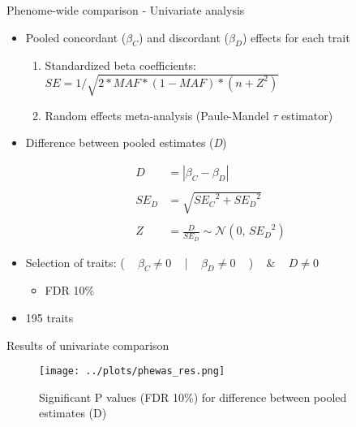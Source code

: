 \documentclass[presentation]{beamer}
\begin{document}
\begin{frame}[label={sec:org800a30b}]{Phenome-wide comparison - Univariate analysis}
\begin{itemize}
\item Pooled concordant (\(\beta_C\)) and discordant (\(\beta_D\)) effects for each trait
\begin{enumerate}
\item Standardized beta coefficients: ~ \(SE = 1/\sqrt{2 * MAF * (1 - MAF) * (n + Z^2)}\)
\item Random effects meta-analysis (Paule-Mandel \(\tau\) estimator)
\end{enumerate}
\item Difference between pooled estimates (\emph{D})
\end{itemize}
\begin{align*}
D & = |\beta_C - \beta_D|\\
\\
SE_D & = \sqrt{{SE_C}^2 + {SE_D}^2}\\
\\
Z & = \frac{D}{SE_D} \sim \mathcal{N}(0,\,{SE_D}^{2})
\end{align*}
\begin{itemize}
\item Selection of traits: ( ~ \(\beta_C \ne 0\) ~ | ~ \(\beta_D \ne 0\) ~ ) ~ \& ~ \(D \ne 0\)
\begin{itemize}
\item FDR 10\%
\end{itemize}
\item 195 traits
\end{itemize}
\end{frame}
\begin{frame}[label={sec:org504ebf9}]{Results of univariate comparison}
\begin{figure}[htbp]
\centering
\texttt{[image: ../plots/phewas\_res.png]}
\caption{Significant P values (FDR 10\%) for difference between pooled estimates (D)}
\end{figure}
\end{frame}
\end{document}
